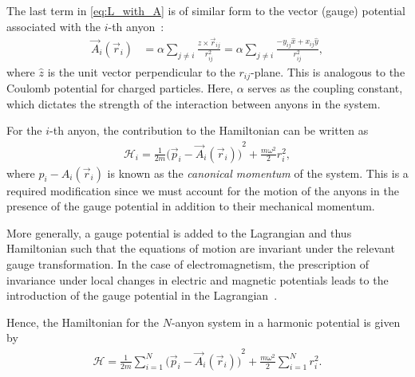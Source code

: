 
The last term in \cref{eq:L_with_A} is of similar form to the vector (gauge) potential associated with the $i$-th anyon~\cite{Khare2005,Date2003,Moriyasu1983}:
\begin{align}
    \vec{A}_i(\vec{r}_i) &= \alpha\sum_{j\neq i}\frac{\hat{z}\times \vec{r}_{ij}}{r_{ij}^2} = \alpha\sum_{j\neq i}\frac{-y_{ij}\hat{x} + x_{ij}\hat{y}}{r_{ij}^2}, \label{eq:gauge}
\end{align}
where $\hat{z}$ is the unit vector perpendicular to the $r_{ij}$-plane. This is analogous to the Coulomb potential for charged particles. Here, $\alpha$ serves as the coupling constant, which dictates the strength of the interaction between anyons in the system.


For the $i$-th anyon, the contribution to the Hamiltonian can be written as
\begin{align}
    \mathcal{H}_i = \frac{1}{2m}{\bigl(\vec{p}_i - \vec{A}_i(\vec{r}_i)\bigr)}^2 + \frac{m\omega^2}{2}{r}_i^{2},
\end{align}
where $p_i - A_i(\vec{r}_i)$ is known as the \textit{canonical momentum} of the system. This is a required modification since we must account for the motion of the anyons in the presence of the gauge potential in addition to their mechanical momentum.

More generally, a gauge potential is added to the Lagrangian and thus Hamiltonian such that the equations of motion are invariant under the relevant gauge transformation. In the case of electromagnetism, the prescription of invariance under local changes in electric and magnetic potentials leads to the introduction of the gauge potential in the Lagrangian~\cite{Griffiths2018,Moriyasu1983,Griffiths2017}.

Hence, the Hamiltonian for the $N$-anyon system in a harmonic potential is given by
\begin{align}
    \mathcal{H} = \frac{1}{2m} \sum_{i=1}^{N}{\bigl(\vec{p}_i - \vec{A}_i(\vec{r}_i)\bigr)}^2 + \frac{m\omega^2}{2}\sum_{i=1}^{N}{r}_i^{2}. \label{eq:min_prescription_H}
\end{align}

